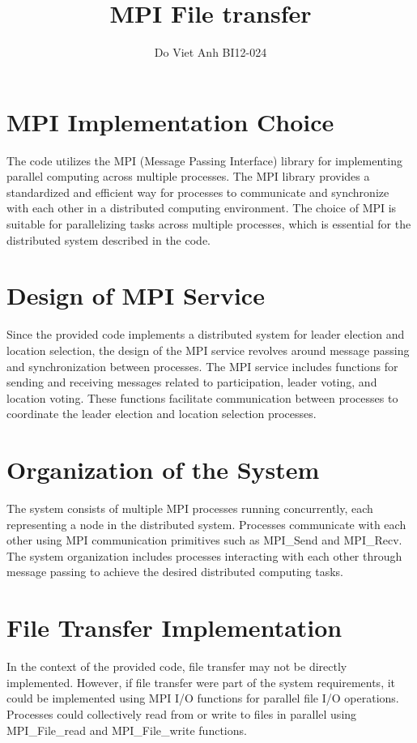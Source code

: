 \documentclass{article}
\title{MPI File transfer}
\author{Do Viet Anh BI12-024}
\begin{document}
\maketitle

\section{MPI Implementation Choice}
The code utilizes the MPI (Message Passing Interface) library for implementing parallel computing across multiple processes. The MPI library provides a standardized and efficient way for processes to communicate and synchronize with each other in a distributed computing environment. The choice of MPI is suitable for parallelizing tasks across multiple processes, which is essential for the distributed system described in the code.

\section{Design of MPI Service}
Since the provided code implements a distributed system for leader election and location selection, the design of the MPI service revolves around message passing and synchronization between processes. The MPI service includes functions for sending and receiving messages related to participation, leader voting, and location voting. These functions facilitate communication between processes to coordinate the leader election and location selection processes.

\section{Organization of the System}
The system consists of multiple MPI processes running concurrently, each representing a node in the distributed system. Processes communicate with each other using MPI communication primitives such as MPI\_Send and MPI\_Recv. The system organization includes processes interacting with each other through message passing to achieve the desired distributed computing tasks.

\section{File Transfer Implementation}
In the context of the provided code, file transfer may not be directly implemented. However, if file transfer were part of the system requirements, it could be implemented using MPI I/O functions for parallel file I/O operations. Processes could collectively read from or write to files in parallel using MPI\_File\_read and MPI\_File\_write functions.
\end{document}
